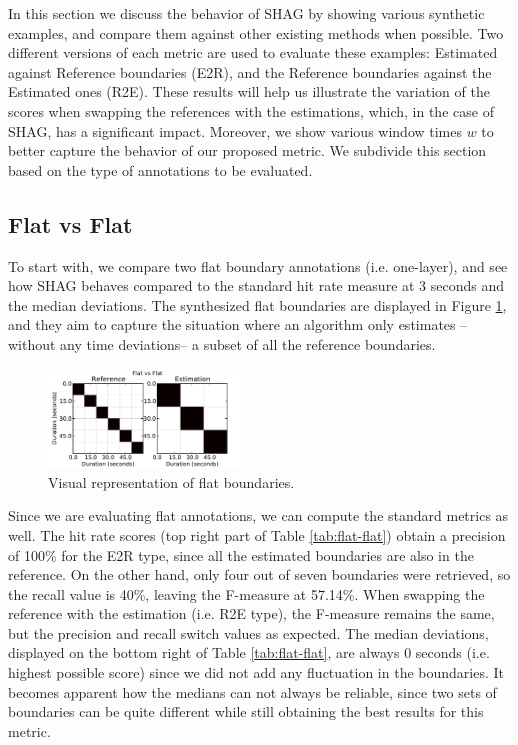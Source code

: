 \documentclass{article}
\begin{document}
In this section we discuss the behavior of SHAG by showing various synthetic examples, and compare them against other existing methods when possible.
Two different versions of each metric are used to evaluate these examples: Estimated against Reference boundaries (E2R), and the Reference boundaries against the Estimated ones (R2E).
These results will help us illustrate the variation of the scores when swapping the references with the estimations, which, in the case of SHAG, has a significant impact.
Moreover, we show various window times $w$ to better capture the behavior of our proposed metric.
We subdivide this section based on the type of annotations to be evaluated.

\subsection{Flat vs Flat}

To start with, we compare two flat boundary annotations (i.e. one-layer), and see how SHAG behaves compared to the standard hit rate measure at 3 seconds and the median deviations.
The synthesized flat boundaries are displayed in Figure \ref{fig:flat-flat}, and they aim to capture the situation where an algorithm only estimates --without any time deviations-- a subset of all the reference boundaries.

\begin{figure}
  \centering
  \includegraphics[width=0.47\textwidth]{plots/flat-flat.pdf}
  \caption{Visual representation of flat boundaries.}
  \label{fig:flat-flat}
\end{figure}%

Since we are evaluating flat annotations, we can compute the standard metrics as well. The hit rate scores (top right part of Table \ref{tab:flat-flat}) obtain a precision of 100\% for the E2R type, since all the estimated boundaries are also in the reference.
On the other hand, only four out of seven boundaries were retrieved, so the recall value is 40\%, leaving the F-measure at 57.14\%.
When swapping the reference with the estimation (i.e. R2E type), the F-measure remains the same, but the precision and recall switch values as expected.
The median deviations, displayed on the bottom right of Table \ref{tab:flat-flat}, are always 0 seconds (i.e. highest possible score) since we did not add any fluctuation in the boundaries.
It becomes apparent how the medians can not always be reliable, since two sets of boundaries can be quite different while still obtaining the best results for this metric.
\end{document}
